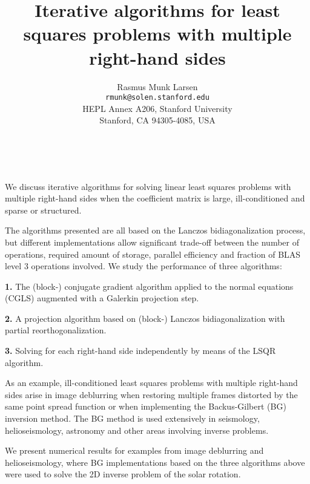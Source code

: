 \documentclass[11pt]{article}
\date{ ~ \hspace{-4mm}}
\title{Iterative algorithms for least squares problems with multiple right-hand sides  }
\author{Rasmus Munk Larsen \\ {\tt rmunk@solen.stanford.edu} \\   HEPL Annex A206,  Stanford University   \\ Stanford, CA 94305-4085, USA}
\begin{document}
\maketitle
\thispagestyle{empty}





 



We discuss iterative algorithms for solving linear least squares
problems with multiple right-hand sides when the coefficient matrix is
large, ill-conditioned and sparse or structured.




The algorithms presented are all based on the Lanczos
bidiagonalization process, but different implementations allow
significant trade-off between the number of operations, required
amount of storage, parallel efficiency and fraction of BLAS level 3
operations involved. We study the performance of three algorithms:
 \newline 


{\bf 
1.
}
The (block-) conjugate gradient algorithm applied to the normal
equations (CGLS) augmented with a Galerkin projection step.
 \newline 

{\bf 
2.
}
A projection algorithm based on (block-) Lanczos bidiagonalization
with partial reorthogonalization.
 \newline 

{\bf 
3.
}
Solving for each right-hand side independently by means of the LSQR
algorithm. 





As an example, ill-conditioned least squares problems with
multiple right-hand sides arise in image deblurring when restoring
multiple frames distorted by the same point spread function or when
implementing the Backus-Gilbert (BG) inversion method. The BG method
is used extensively in seismology, helioseismology, astronomy and
other areas involving inverse problems.

We present numerical results for examples from image deblurring and
helioseismology, where BG implementations based on the three algorithms
above were used to solve the 2D inverse problem of the solar rotation.
\end{document}
